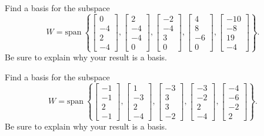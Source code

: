 \documentclass{article}
\begin{document}
\begin{exerciseStatement}
    Find a basis for the subspace
\[W=\mathrm{span}\ \left\{\left[\begin{array}{r}
0 \\
-4 \\
2 \\
-4
\end{array}\right] , \left[\begin{array}{r}
2 \\
-4 \\
-4 \\
0
\end{array}\right] , \left[\begin{array}{r}
-2 \\
-4 \\
3 \\
0
\end{array}\right] , \left[\begin{array}{r}
4 \\
8 \\
-6 \\
0
\end{array}\right] , \left[\begin{array}{r}
-10 \\
-8 \\
19 \\
-4
\end{array}\right]\right\}.\]
 Be sure to explain why your result is a basis.


  
\end{exerciseStatement}

\begin{exerciseStatement}
    Find a basis for the subspace
\[W=\mathrm{span}\ \left\{\left[\begin{array}{r}
-1 \\
-1 \\
2 \\
-1
\end{array}\right] , \left[\begin{array}{r}
1 \\
-3 \\
2 \\
-4
\end{array}\right] , \left[\begin{array}{r}
-3 \\
3 \\
3 \\
-2
\end{array}\right] , \left[\begin{array}{r}
-3 \\
-2 \\
2 \\
-4
\end{array}\right] , \left[\begin{array}{r}
-4 \\
-6 \\
-2 \\
2
\end{array}\right]\right\}.\]
 Be sure to explain why your result is a basis.


  
\end{exerciseStatement}
\end{document}
